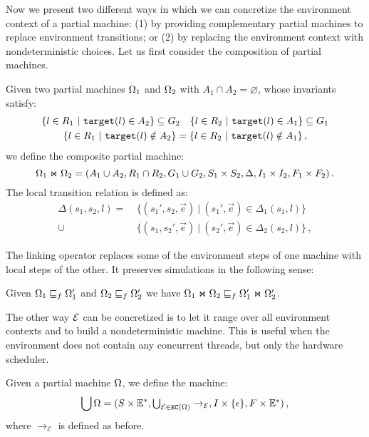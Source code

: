 Now we present two different ways in which
we can concretize the environment context of a partial machine:
(1) by providing complementary partial machines to replace environment transitions;
or (2) by replacing the environment context with nondeterministic choices.
Let us first consider the composition of partial machines.

\begin{definition}
\label{def:link:partial}
Given two partial machines $\Omega_1$ and $\Omega_2$ with
$A_1 \cap A_2 = \varnothing$,
whose invariants satisfy:
\begin{gather*}
\{ l \in R_1 \ |\ \kw{target}(l) \in A_2 \} \subseteq G_2 \quad
\{ l \in R_2 \ |\ \kw{target}(l) \in A_1 \} \subseteq G_1 \\
\{ l \in R_1 \ |\ \kw{target}(l) \notin A_2 \} = \{ l \in R_2 \ |\ \kw{target}(l) \notin A_1 \}\,,
\end{gather*}
we define the composite partial machine:
\[ \Omega_1 \Join \Omega_2 =
	(A_1 \cup A_2,
	 R_1 \cap R_2,
	 G_1 \cup G_2,
	 S_1 \times S_2,
	 \Delta,
	 I_1 \times I_2,
	 F_1 \times F_2) \,. \]
The local transition relation is defined as:
\begin{align*}
\Delta(s_1, s_2, l) =
	&\ \{ (s_1', s_2, \vec{e}) \ |\ (s_1', \vec{e}) \in \Delta_1(s_1, l) \} \\ \cup
	&\ \{ (s_1, s_2', \vec{e}) \ |\ (s_2', \vec{e}) \in \Delta_2(s_2, l) \} \,,
\end{align*}
\end{definition}

The linking operator replaces some of the environment steps of one machine
with local steps of the other.
It preserves simulations in the following sense:

\begin{lemma}
\label{lemma:mono}
Given $\Omega_1 \sqsubseteq_f \Omega_1'$ and $\Omega_2 \sqsubseteq_f \Omega_2'$ we have
$\Omega_1 \Join \Omega_2 \sqsubseteq_f \Omega_1' \Join \Omega_2'$.
\end{lemma}

The other way $\mathcal{E}$ can be concretized
is to let it range over all environment contexts
and to build a nondeterministic machine.
This is useful when the environment
does not contain any concurrent threads,
but only the hardware scheduler.

\begin{definition}
Given a partial machine $\Omega$,
we define the machine:
\[ \bigcup \Omega =
	(S \times \mathbb{E}^*, \textstyle\bigcup\nolimits_{\mathcal{E} \in {{{\texttt{EC}}}({\Omega})}} \rightarrow_\mathcal{E},
		I \times \{ \epsilon \}, F \times \mathbb{E}^*) \,, \]
where $\rightarrow_\mathcal{E}$ is defined as before.
\end{definition}

